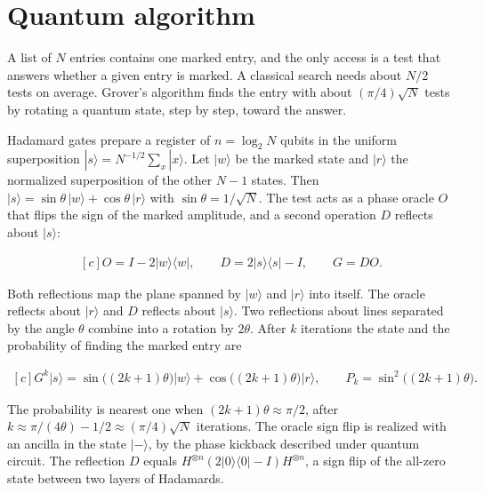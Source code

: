 \documentclass[11pt,oneside]{book}
\newenvironment{centeredalign}{\[\begin{gathered}[c]}{\end{gathered}\]}
\begin{document}
\clearpage

\section{Quantum algorithm}

\label{topic:quantum-algorithm}

A list of \(N\) entries contains one marked entry, and the only access is a test that answers whether a given entry is marked. A classical search needs about \(N/2\) tests on average. Grover's algorithm finds the entry with about \((\pi/4)\sqrt N\) tests by rotating a quantum state, step by step, toward the answer.

Hadamard gates prepare a register of \(n=\log_2N\) qubits in the uniform superposition \(|s\rangle=N^{-1/2}\sum_x|x\rangle\). Let \(|w\rangle\) be the marked state and \(|r\rangle\) the normalized superposition of the other \(N-1\) states. Then \(|s\rangle=\sin\theta\,|w\rangle+\cos\theta\,|r\rangle\) with \(\sin\theta=1/\sqrt N\). The test acts as a phase oracle \(O\) that flips the sign of the marked amplitude, and a second operation \(D\) reflects about \(|s\rangle\):

\begin{centeredalign}
O=I-2|w\rangle\langle w|,\qquad D=2|s\rangle\langle s|-I,\qquad G=DO.
\end{centeredalign}

Both reflections map the plane spanned by \(|w\rangle\) and \(|r\rangle\) into itself. The oracle reflects about \(|r\rangle\) and \(D\) reflects about \(|s\rangle\). Two reflections about lines separated by the angle \(\theta\) combine into a rotation by \(2\theta\). After \(k\) iterations the state and the probability of finding the marked entry are

\begin{centeredalign}
G^k|s\rangle=\sin\big((2k+1)\theta\big)|w\rangle+\cos\big((2k+1)\theta\big)|r\rangle,\qquad
P_k=\sin^2\big((2k+1)\theta\big).
\end{centeredalign}

The probability is nearest one when \((2k+1)\theta\approx\pi/2\), after \(k\approx\pi/(4\theta)-1/2\approx(\pi/4)\sqrt N\) iterations. The oracle sign flip is realized with an ancilla in the state \(|-\rangle\), by the phase kickback described under quantum circuit. The reflection \(D\) equals \(H^{\otimes n}(2|0\rangle\langle0|-I)H^{\otimes n}\), a sign flip of the all-zero state between two layers of Hadamards.
\end{document}
